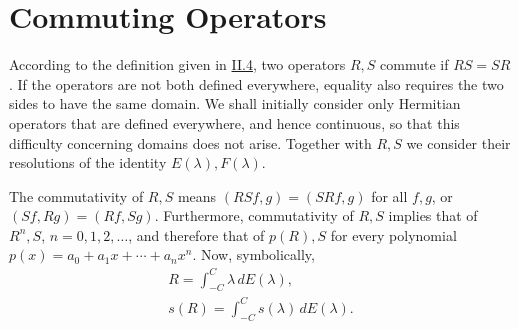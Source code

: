\documentclass[fontsize=13pt,twoside,openany,headings=normal,parskip=false,bookmarkpackage=false,DIV=calc]{scrbook}
\begin{document}
\section{Commuting Operators}\label{sec:II.10}
According to the definition given in \hyperref[sec:II.4]{II.4}, two operators $R,S$ commute if $RS=SR$. If the operators are not both defined everywhere, equality also requires the two sides to have the same domain. We shall initially consider only Hermitian operators that are defined everywhere, and hence continuous, so that this difficulty concerning domains does not arise. Together with $R,S$ we consider their resolutions of the identity $E(\lambda),F(\lambda)$.

The commutativity of $R,S$ means $(RSf,g)=(SRf,g)$ for all $f,g$, or $(Sf,Rg)=(Rf,Sg)$. Furthermore, commutativity of $R,S$ implies that of $R^n,S$, $n=0,1,2,\ldots$, and therefore that of $p(R),S$ for every polynomial $p(x)=a_0+a_1x+\cdots+a_nx^n$. Now, symbolically,
\begin{gather*}
R=\int_{-C}^C\lambda\,dE(\lambda),\\
s(R)=\int_{-C}^Cs(\lambda)\,dE(\lambda).
\end{gather*}
\end{document}
